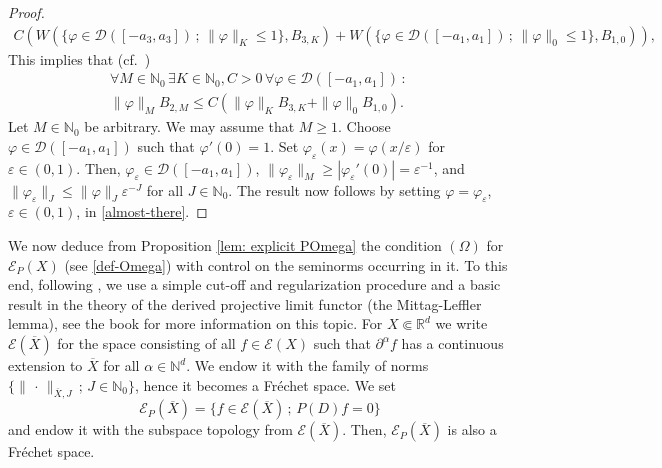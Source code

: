 \documentclass[12pt]{amsart}
\newcommand{\N}{\mathbb{N}}
\newcommand{\R}{\mathbb{R}}
\theoremstyle{definition}
\theoremstyle{remark}
\numberwithin{equation}{section}
\begin{document}
\begin{proof}
\begin{gather*}
		C\left(W\left(\{\varphi\in\mathscr{D}([-a_3,a_3])\, ; \,\|\varphi\|_K\leq 1\},B_{3,K}\right)  +W\left(\{\varphi\in\mathscr{D}([-a_1,a_1]) \,;\,\|\varphi\|_0\leq 1\},B_{1,0}\right)\right),
	\end{gather*}
	 This implies that (cf.\  \cite[Proof of necessity in Theorem 4.1]{B-D2006}) 
\begin{gather}\label{almost-there}
		\forall M\in\N_0\, \exists K \in \N_0, C > 0 \,\forall \varphi \in \mathscr{D}([-a_1,a_1]) \, :\, \\ \nonumber
	\|\varphi\|_MB_{2,M}\leq C\left(\|\varphi\|_KB_{3,K}+ \|\varphi\|_0 B_{1,0}\right).
\end{gather}
Let $M\in\N_0$ be arbitrary. We may assume that $M \geq 1$. Choose $\varphi \in \mathscr{D}([-a_1,a_1])$ such that $\varphi'(0) = 1$. Set $\varphi_\varepsilon(x) = \varphi(x/\varepsilon)$ for  $\varepsilon\in (0,1)$. Then, $\varphi_\varepsilon \in \mathscr{D}([-a_1,a_1])$, $\| \varphi_\varepsilon\|_M \geq |\varphi_\varepsilon'(0)| = \varepsilon^{-1}$, and $\| \varphi_\varepsilon\|_J \leq \| \varphi\|_J \varepsilon^{-J}$ for all $J \in \N_0$. The result now follows by setting $\varphi = \varphi_{\varepsilon}$, $\varepsilon\in (0,1)$, in  \eqref{almost-there}.
\end{proof}
We now  deduce from Proposition \ref{lem: explicit POmega} the  condition $(\Omega)$  for $\mathscr{E}_P(X)$ (see \eqref{def-Omega}) with control on the seminorms occurring in it. To this end, following \cite{DeKa22}, we use a simple cut-off and regularization procedure and a basic result in the theory of the derived projective limit functor (the Mittag-Leffler lemma), see the book \cite{Wengenroth} for more information on this topic. For $X \Subset \R^d$ we write $\mathscr{E}(\overline{X})$ for the space consisting of all $f \in \mathscr{E}(X)$ such that $\partial^\alpha f$ has a continuous extension to $\overline{X}$ for all $\alpha \in \N^d$.  We endow it with the family of norms $\{\| \, \cdot \, \|_{{\overline{X},J}} \, ; \, J \in \N_0\}$, hence it becomes a Fr\'echet space. We set
$$
\mathscr{E}_P(\overline{X}) = \{f \in \mathscr{E}(\overline{X}) \, ; \, P(D) f = 0\}
$$
and endow it with the subspace topology from $\mathscr{E}(\overline{X})$. Then,  $\mathscr{E}_P(\overline{X})$ is also a Fr\'echet space.
\end{document}
